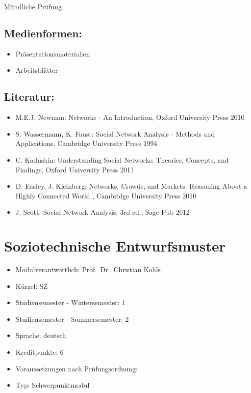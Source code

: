 Mündliche Prüfung

\section*{Medienformen:}\label{medienformen-11}

\begin{itemize}
\item
  Präsentationsmaterialien
\item
  Arbeitsblätter
\end{itemize}

\section*{Literatur:}\label{literatur-8}

\begin{itemize}
\item
  M.E.J. Newman: Networks - An Introduction, Oxford University Press
  2010
\item
  S. Wassermann, K. Faust: Social Network Analysis - Methods and
  Applications, Cambridge University Press 1994
\item
  C. Kadushin: Understanding Social Networks: Theories, Concepts, and
  Findings, Oxford University Press 2011
\item
  D. Easley, J. Kleinberg: Networks, Crowds, and Markets: Reasoning
  About a Highly Connected World , Cambridge University Press 2010
\item
  J. Scott: Social Network Analysis, 3rd ed., Sage Pub 2012
\end{itemize}

\chapter{Soziotechnische
Entwurfsmuster}\label{soziotechnische-entwurfsmuster}

\begin{itemize}
\tightlist
\item
  Modulverantwortlich: Prof.~Dr.~Christian Kohls
\item
  Kürzel: SZ
\item
  Studiensemester - Wintersemester: 1
\item
  Studiensemester - Sommersemester: 2
\item
  Sprache: deutsch
\item
  Kreditpunkte: 6
\item
  Voraussetzungen nach Prüfungsordnung:
\item
  Typ: Schwerpunktmodul
\end{itemize}

